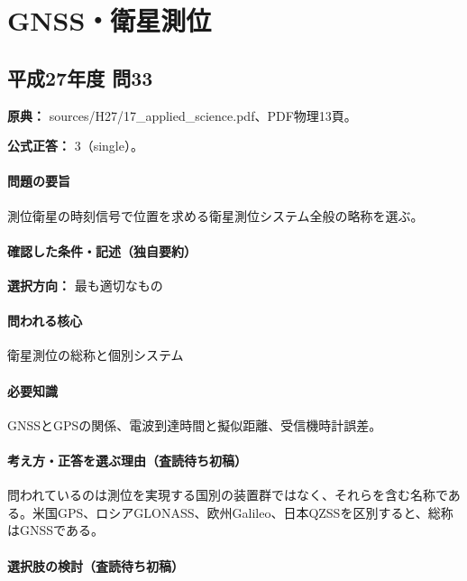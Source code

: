 \section{GNSS・衛星測位}

\subsection{平成27年度 問33}
\label{q:h27-reg-applied-33}

\noindent\textbf{原典：} sources/H27/17\_applied\_science.pdf、PDF物理13頁。

\textbf{公式正答：} 3（single）。

\paragraph{問題の要旨} 測位衛星の時刻信号で位置を求める衛星測位システム全般の略称を選ぶ。

\paragraph{確認した条件・記述（独自要約）}\mbox{}\par

\noindent\textbf{選択方向：} 最も適切なもの\par

\paragraph{問われる核心} 衛星測位の総称と個別システム

\paragraph{必要知識} GNSSとGPSの関係、電波到達時間と擬似距離、受信機時計誤差。

\paragraph{考え方・正答を選ぶ理由（査読待ち初稿）} 問われているのは測位を実現する国別の装置群ではなく、それらを含む名称である。米国GPS、ロシアGLONASS、欧州Galileo、日本QZSSを区別すると、総称はGNSSである。

\paragraph{選択肢の検討（査読待ち初稿）}\mbox{}\par

